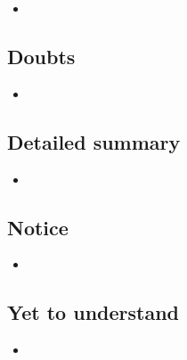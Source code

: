\documentclass{article}
\begin{document}
    \begin{itemize}

    \item 
    
    \end{itemize}

\subsection{Doubts}

    \begin{itemize}

    \item 
    
    \end{itemize}

\subsection{Detailed summary}

    \begin{itemize}

    \item 
    
    \end{itemize}

\subsection{Notice}

    \begin{itemize}

    \item 
    
    \end{itemize}

\subsection{Yet to understand}

    \begin{itemize}

    \item 
    
    \end{itemize}
\end{document}
